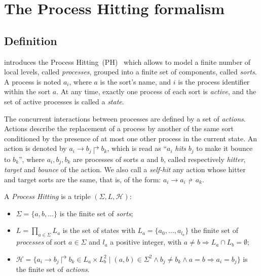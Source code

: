 \documentclass{movep}
\def\pref{\prettyref}
\newcommand{\PHs}{\Sigma}
\newcommand{\PHl}{L}
\newcommand{\PHa}{\PHh}
\newcommand{\PHh}{\mathcal{H}}
\newcommand{\PHfrappeA}{\rightarrow}
\newcommand{\PHfrappeB}{\Rsh}
\newcommand{\PHfrappe}[3]{#1\PHfrappeA#2\PHfrappeB#3}
\newcounter{la}
\begin{document}



\section{The Process Hitting formalism}
\label{sec:ph}

\subsection{Definition}

\pref{def:PH} introduces the Process Hitting~(PH)~\cite{PMR10-TCSB}
which allows to model
a finite number of local levels,
called \emph{processes},
grouped into a finite set of components, called \emph{sorts}.
A process is noted $a_i$, where $a$ is the sort's name,
and $i$ is the process identifier within the sort $a$.
At any time, exactly one process of each sort is \emph{active},
and the set of active processes is called a \emph{state}.

The concurrent interactions between processes are defined by a set of \emph{actions}.
Actions describe the replacement of a process by another of the same sort
conditioned by the presence of at most one other process in the current state.
An action is denoted by $\PHfrappe{a_i}{b_j}{b_k}$, which is read as
``$a_i$ \emph{hits} $b_j$ to make it bounce to $b_k$'',
where $a_i,b_j,b_k$ are processes of sorts $a$ and $b$,
called respectively \emph{hitter}, \emph{target} and
\emph{bounce} of the action.
We also call a \emph{self-hit} any action whose hitter and target sorts are the same,
that is, of the form: $\PHfrappe{a_i}{a_i}{a_k}$.

\begin{definition}\label{def:PH}
  A \emph{Process Hitting} is a triple $(\PHs,\PHl,\PHa)$:
  \begin{itemize}
    \item $\PHs = \{a,b,\dots\}$ is the finite set of \emph{sorts};
    \item $\PHl = \prod_{a\in\PHs} \PHl_a$ is the set of states with
      $\PHl_a = \{a_0,\dots,a_{l_a}\}$
      the finite set of \emph{processes} of sort $a\in\Sigma$
      and $l_a$ a positive integer, with $a\neq b\Rightarrow \PHl_a \cap \PHl_b = \emptyset$;
    \item $\PHa = \{ \PHfrappe{a_i}{b_j}{b_k} \in \PHl_a \times \PHl_b^2 \mid
      (a,b) \in \PHs^2 \wedge b_j\neq b_k \wedge a=b\Rightarrow a_i=b_j\}$
      is the finite set of \emph{actions}.
  \end{itemize}
\end{definition}
\end{document}
